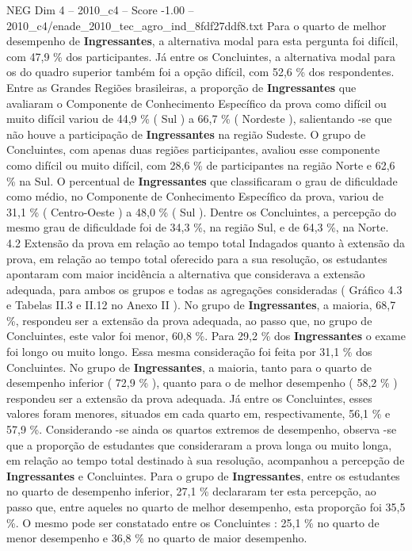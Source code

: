 \begin{textsample}{NEG Dim 4 – 2010\_c4 – Score -1.00 – 2010\_c4/enade\_2010\_tec\_agro\_ind\_8fdf27ddf8.txt}
Para o quarto de melhor desempenho de \textbf{Ingressantes}, a alternativa modal para esta pergunta foi difícil, com 47,9 \% dos participantes.
Já entre os Concluintes, a alternativa modal para os do quadro superior também foi a opção difícil, com 52,6 \% dos respondentes.
Entre as Grandes Regiões brasileiras, a proporção de \textbf{Ingressantes} que avaliaram o Componente de Conhecimento Específico da prova como difícil ou muito difícil variou de 44,9 \% ( Sul ) a 66,7 \% ( Nordeste ), salientando -se que não houve a participação de \textbf{Ingressantes} na região Sudeste.
O grupo de Concluintes, com apenas duas regiões participantes, avaliou esse componente como difícil ou muito difícil, com 28,6 \% de participantes na região Norte e 62,6 \% na Sul.
O percentual de \textbf{Ingressantes} que classificaram o grau de dificuldade como médio, no Componente de Conhecimento Específico da prova, variou de 31,1 \% ( Centro-Oeste ) a 48,0 \% ( Sul ).
Dentre os Concluintes, a percepção do mesmo grau de dificuldade foi de 34,3 \%, na região Sul, e de 64,3 \%, na Norte. 4.2 Extensão da prova em relação ao tempo total Indagados quanto à extensão da prova, em relação ao tempo total oferecido para a sua resolução, os estudantes apontaram com maior incidência a alternativa que considerava a extensão adequada, para ambos os grupos e todas as agregações consideradas ( Gráfico 4.3 e Tabelas II.3 e II.12 no Anexo II ).
No grupo de \textbf{Ingressantes}, a maioria, 68,7 \%, respondeu ser a extensão da prova adequada, ao passo que, no grupo de Concluintes, este valor foi menor, 60,8 \%.
Para 29,2 \% dos \textbf{Ingressantes} o exame foi longo ou muito longo.
Essa mesma consideração foi feita por 31,1 \% dos Concluintes.
No grupo de \textbf{Ingressantes}, a maioria, tanto para o quarto de desempenho inferior ( 72,9 \% ), quanto para o de melhor desempenho ( 58,2 \% ) respondeu ser a extensão da prova adequada.
Já entre os Concluintes, esses valores foram menores, situados em cada quarto em, respectivamente, 56,1 \% e 57,9 \%.
Considerando -se ainda os quartos extremos de desempenho, observa -se que a proporção de estudantes que consideraram a prova longa ou muito longa, em relação ao tempo total destinado à sua resolução, acompanhou a percepção de \textbf{Ingressantes} e Concluintes.
Para o grupo de \textbf{Ingressantes}, entre os estudantes no quarto de desempenho inferior, 27,1 \% declararam ter esta percepção, ao passo que, entre aqueles no quarto de melhor desempenho, esta proporção foi 35,5 \%.
O mesmo pode ser constatado entre os Concluintes : 25,1 \% no quarto de menor desempenho e 36,8 \% no quarto de maior desempenho.

\end{textsample}
